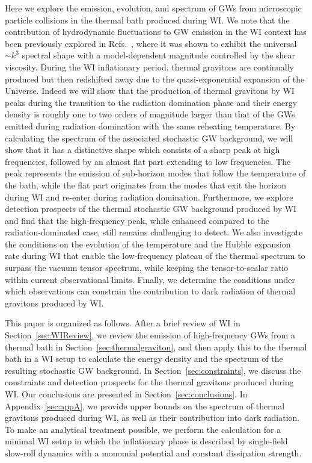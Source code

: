 \documentclass[aps,prd,twocolumn,showpacs,superscriptaddress,nofootinbib,preprintnumbers]{revtex4-2}
\begin{document}
Here we explore the emission, evolution, and spectrum of GWs from microscopic particle collisions in the thermal bath produced during WI. We note that the contribution of hydrodynamic fluctuations to GW emission in the WI context has been previously explored in Refs.~\cite{Qiu:2021ytc,Klose:2022rxh}, where it was shown to exhibit the universal $\sim k^3$ spectral shape with a model-dependent magnitude controlled by the shear viscosity. During the WI inflationary period, thermal gravitons are continually produced but then redshifted away due to the quasi-exponential expansion of the Universe.
Indeed we will show that the production of thermal gravitons by WI peaks during the transition to the radiation domination phase and their energy density is roughly one to two orders of magnitude larger than that of the  GWs emitted during radiation domination with the same reheating temperature. By calculating the spectrum of the associated stochastic GW background, we will show that it has a distinctive shape which consists of a sharp peak at high frequencies, followed by an almost flat part extending to low frequencies. The peak represents the emission of sub-horizon modes that follow the temperature of the bath, while the flat part  originates from the modes that exit the horizon during WI and re-enter during radiation domination. Furthermore, we explore detection prospects of the thermal stochastic GW background produced by WI and find that the high-frequency peak, while enhanced compared to the radiation-dominated case, still remains challenging to detect. We also investigate the conditions on the evolution of the temperature and the Hubble expansion rate during
WI that enable the low-frequency plateau of the thermal spectrum to surpass the vacuum tensor spectrum, while keeping the tensor-to-scalar ratio within current observational limits. Finally, we determine the conditions under which observations can constrain the contribution to dark radiation of thermal gravitons produced by WI.
   
This paper is organized as follows. After a brief review of WI in Section~\ref{sec:WIReview}, we  review the emission of high-frequency GWs from a thermal bath in Section~\ref{sec:thermalgraviton}, and then apply this to the thermal bath in a WI setup to calculate the energy density and the spectrum of the resulting stochastic GW background. In Section~\ref{sec:constraints}, we discuss the constraints and detection prospects for the
thermal gravitons produced during WI. Our conclusions are presented in Section~\ref{sec:conclusions}. In Appendix~\ref{sec:appA}, we provide upper bounds on the spectrum of thermal gravitons produced during WI, as well as their contribution into dark radiation. To make an analytical treatment possible, we perform the calculation for a minimal WI setup in which the inflationary phase is described by single-field slow-roll dynamics with a monomial potential and constant dissipation strength.
\end{document}
